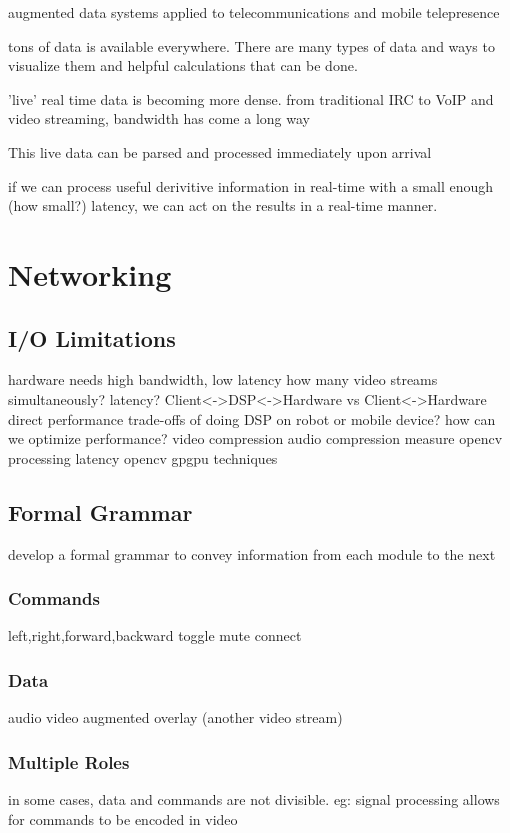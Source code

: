 \documentclass[a4paper,12pt]{report}
\begin{document}
augmented data systems applied to telecommunications and mobile telepresence

tons of data is available everywhere. There are many types of data and ways to visualize them and helpful calculations that can be done.

'live' real time data is becoming more dense. from traditional IRC to VoIP and video streaming, bandwidth has come a long way

This live data can be parsed and processed immediately upon arrival

if we can process useful derivitive information in real-time with a small enough (how small?) latency, we can act on the results in a real-time manner.

\section{Networking}
	\subsection{I/O Limitations}
		hardware needs high bandwidth, low latency
		how many video streams simultaneously?
		latency? Client\textless -\textgreater DSP\textless -\textgreater Hardware vs Client\textless -\textgreater Hardware direct
		performance trade-offs of doing DSP on robot or mobile device?
		how can we optimize performance?
			video compression
			audio compression
			measure opencv processing latency
			opencv gpgpu techniques
	\subsection{Formal Grammar}
		develop a formal grammar to convey information from each module to the next
		\subsubsection{Commands}
			left,right,forward,backward
			toggle mute
			connect
		\subsubsection{Data}
			audio
			video
			augmented overlay (another video stream)
		\subsubsection{Multiple Roles}
			in some cases, data and commands are not divisible. eg: signal processing allows for commands to be encoded in video
\end{document}
